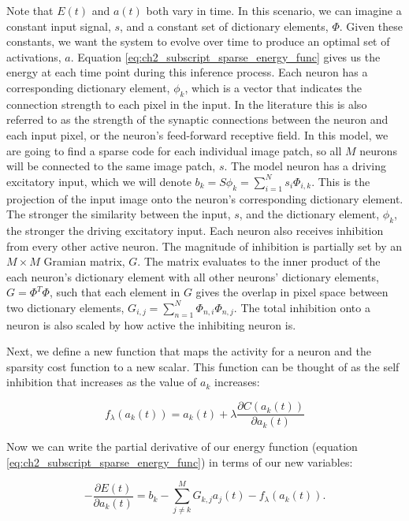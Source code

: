 Note that $E(t)$ and $a(t)$ both vary in time. In this scenario, we can imagine a constant input signal, $s$, and a constant set of dictionary elements, $\Phi$. Given these constants, we want the system to evolve over time to produce an optimal set of activations, $a$. Equation \eqref{eq:ch2_subscript_sparse_energy_func} gives us the energy at each time point during this inference process. Each neuron has a corresponding dictionary element, $\phi_{k}$, which is a vector that indicates the connection strength to each pixel in the input. In the literature this is also referred to as the strength of the synaptic connections between the neuron and each input pixel, or the neuron's feed-forward receptive field. In this model, we are going to find a sparse code for each individual image patch, so all $M$ neurons will be connected to the same image patch, $s$. The model neuron has a driving excitatory input, which we will denote $b_{k} = S\phi_{k} = \sum_{i=1}^{N}s_{i} \Phi_{i,k}$. This is the projection of the input image onto the neuron's corresponding dictionary element. The stronger the similarity between the input, $s$, and the dictionary element, $\phi_{k}$, the stronger the driving excitatory input. Each neuron also receives inhibition from every other active neuron. The magnitude of inhibition is partially set by an $M \times M$ Gramian matrix, $G$. The matrix evaluates to the inner product of the each neuron's dictionary element with all other neurons' dictionary elements, $G = \Phi^T\Phi$, such that each element in $G$ gives the overlap in pixel space between two dictionary elements, $G_{i,j} = \sum\limits_{n=1}^{N} \Phi_{n,i}\Phi_{n,j}$. The total inhibition onto a neuron is also scaled by how active the inhibiting neuron is.

Next, we define a new function that maps the activity for a neuron and the sparsity cost function to a new scalar. This function can be thought of as the self inhibition that increases as the value of $a_{k}$ increases:

\begin{equation}\label{eq:ch2_hopfield_t_func}
  f_{\lambda}(a_{k}(t)) = a_{k}(t) + \lambda \frac{\partial C(a_{k}(t))}{\partial a_{k}(t)}
\end{equation}

Now we can write the partial derivative of our energy function (equation \eqref{eq:ch2_subscript_sparse_energy_func}) in terms of our new variables:

\begin{equation}\label{eq:ch2_lca_deda_simple}
    - \frac{\partial E(t)}{\partial a_{k}(t)} =
    b_{k} -
    \sum\limits_{j \neq k}^{M} G_{k,j} a_{j}(t) -
    f_{\lambda}(a_{k}(t)).
\end{equation}

